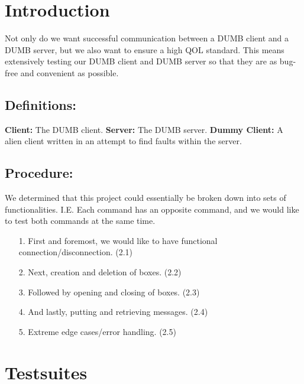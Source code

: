 \documentclass{article}
\title{\vspace{-0.5cm}\titletext}
\date{\vspace{-5ex}}
\begin{document}
    \maketitle
    \thispagestyle{fancy}
    \vspace{-1.0cm}

    \section{Introduction}
        Not only do we want successful communication between a DUMB client and a DUMB server, but we also want to ensure a high QOL standard. This means extensively testing our DUMB client and DUMB server so that they are as bug-free and convenient as possible.
        \subsection{Definitions:}
            \textbf{Client:} The DUMB client. \newline
            \textbf{Server:} The DUMB server. \newline
            \textbf{Dummy Client:} A alien client written in an attempt to find faults within the server.
        \subsection{Procedure:} 
            We determined that this project could essentially be broken down into sets of functionalities. I.E. Each command has an opposite command, and we would like to test both commands at the same time.
            \begin{itemize}
                \item[1.] First and foremost, we would like to have functional connection/disconnection. (2.1)
                \item[2.] Next, creation and deletion of boxes. (2.2)
                \item[3.] Followed by opening and closing of boxes. (2.3)
                \item[4.] And lastly, putting and retrieving messages. (2.4)
                \item[5.] Extreme edge cases/error handling. (2.5) 
            \end{itemize}
    \section{Testsuites}
\end{document}
